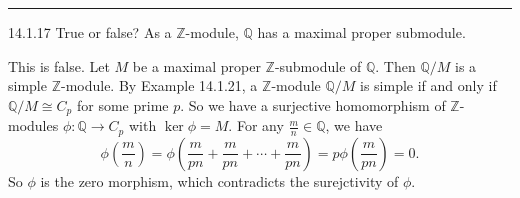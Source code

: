 \documentclass[a4paper, 12pt]{article}
\begin{document}
\noindent\rule{7in}{2.8pt}
\begin{problem}{14.1.17}
True or false? As a \(\mathbb{Z}\)-module, \(\mathbb{Q}\) has a maximal proper submodule.
\end{problem}
\begin{solution}
This is false. Let \(M\) be a maximal proper \(\mathbb{Z}\)-submodule of \(\mathbb{Q}\). Then \(\mathbb{Q}/M\) is a simple \(\mathbb{Z}\)-module. By Example 14.1.21, a \(\mathbb{Z}\)-module \(\mathbb{Q}/M\) is simple if and only if \(\mathbb{Q}/M\cong C_p\) for some prime \(p\). So we have 
a surjective homomorphism of \(\mathbb{Z}\)-modules \(\phi:\mathbb{Q}\rightarrow C_p\) with \(\ker \phi=M\). For any \(\frac{m}{n}\in \mathbb{Q}\), we have 
\[\phi(\frac{m}{n})=\phi(\frac{m}{pn}+\frac{m}{pn}+\cdots+\frac{m}{pn})=p\phi(\frac{m}{pn})=0.\]
So \(\phi\) is the zero morphism, which contradicts the surejctivity of \(\phi\).
\end{solution}
\end{document}
